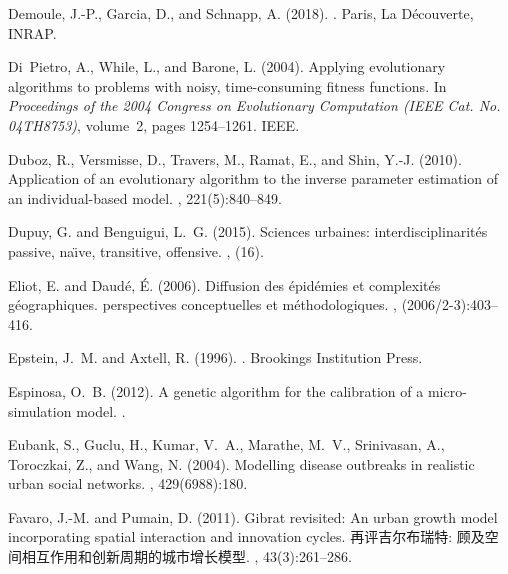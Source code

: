 \documentclass[10pt]{article}
\begin{document}
\begin{thebibliography}{}
Demoule, J.-P., Garcia, D., and Schnapp, A. (2018).
.
\newblock Paris, La Découverte, INRAP.

Di~Pietro, A., While, L., and Barone, L. (2004).
\newblock Applying evolutionary algorithms to problems with noisy,
  time-consuming fitness functions.
\newblock In {\em Proceedings of the 2004 Congress on Evolutionary Computation
  (IEEE Cat. No. 04TH8753)}, volume~2, pages 1254--1261. IEEE.

Duboz, R., Versmisse, D., Travers, M., Ramat, E., and Shin, Y.-J. (2010).
\newblock Application of an evolutionary algorithm to the inverse parameter
  estimation of an individual-based model.
, 221(5):840--849.

Dupuy, G. and Benguigui, L.~G. (2015).
\newblock Sciences urbaines: interdisciplinarit{\'e}s passive, na{\"\i}ve,
  transitive, offensive.
, (16).

Eliot, E. and Daud{\'e}, {\'E}. (2006).
\newblock Diffusion des {\'e}pid{\'e}mies et complexit{\'e}s g{\'e}ographiques.
  perspectives conceptuelles et m{\'e}thodologiques.
, (2006/2-3):403--416.

Epstein, J.~M. and Axtell, R. (1996).
.
\newblock Brookings Institution Press.

Espinosa, O.~B. (2012).
\newblock A genetic algorithm for the calibration of a micro-simulation model.
.

Eubank, S., Guclu, H., Kumar, V.~A., Marathe, M.~V., Srinivasan, A., Toroczkai,
  Z., and Wang, N. (2004).
\newblock Modelling disease outbreaks in realistic urban social networks.
, 429(6988):180.

Favaro, J.-M. and Pumain, D. (2011).
\newblock Gibrat revisited: An urban growth model incorporating spatial
  interaction and innovation cycles. 再评吉尔布瑞特:
  顾及空间相互作用和创新周期的城市增长模型.
, 43(3):261--286.


\end{thebibliography}
\end{document}
